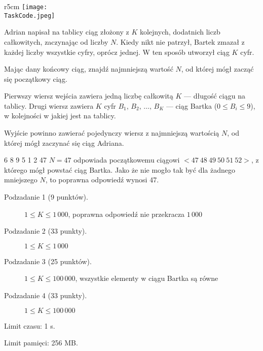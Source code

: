 \documentclass{boi2014-pl}
\renewcommand{\TaskCode}{sequence}
\begin{document}
    \begin{wrapfigure}[5]{r}{5cm}
        \vspace{-24pt}
		\texttt{[image: \\TaskCode.jpeg]}
	\end{wrapfigure}

    Adrian napisał na tablicy ciąg złożony z $K$ kolejnych, dodatnich liczb całkowitych, zaczynając od liczby $N$.
    Kiedy nikt nie patrzył, Bartek zmazał z każdej liczby wszystkie cyfry, oprócz jednej.
    W ten sposób utworzył ciąg $K$ cyfr.

    \Task

    Mając dany końcowy ciąg, znajdź najmniejszą wartość $N$, od której mógł zacząć się początkowy ciąg.

    \Input

    Pierwszy wiersz wejścia zawiera jedną liczbę całkowitą $K$ --- długość ciągu na tablicy.
    Drugi wiersz zawiera $K$ cyfr $B_1,\, B_2 ,\, \ldots ,\, B_K$ --- ciąg Bartka ($0 \le B_i \le 9$), w kolejności w jakiej jest na tablicy.
    
    \Output

    Wyjście powinno zawierać pojedynczy wiersz z najmniejszą wartością $N$, od której mógł zaczynać się ciąg Adriana.
    
    \Example

    \example
    {
        6 8 9 5 1 2
    }
    {
        47
    }
    {
        $N = 47$ odpowiada początkowemu ciągowi $<47\ 48\ 49\ 50\ 51\ 52>$, z którego mógł powstać ciąg Bartka. Jako że nie mogło tak być dla żadnego mniejszego $N$, to poprawna odpowiedź wynosi 47.
    }

\Scoring

\begin{description}
    \item[Podzadanie 1 (9 punktów).] $1 \le K \le 1\,000$, poprawna odpowiedź nie przekracza $1\,000$
    \item[Podzadanie 2 (33 punkty).] $1 \le K \le 1\,000$
    \item[Podzadanie 3 (25 punktów).] $1 \le K \le 100\,000$, wszystkie elementy w ciągu Bartka są równe
    \item[Podzadanie 4 (33 punkty).] $1 \le K \le 100\,000$
\end{description}

\Constraints

Limit czasu: 1 s.

Limit pamięci: 256 MB.
\end{document}
